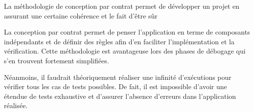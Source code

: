 \documentclass[a4paper, 11pt, notitlepage]{article}
\begin{document}
La méthodologie de conception par contrat permet de développer un projet en assurant une certaine cohérence et le fait d'être sûr 

La conception par contrat permet de penser l'application en terme de composants indépendants et de définir des règles afin d'en faciliter l'implémentation et la vérification. Cette méthodologie est avantageuse lors des phases de débogage qui s'en trouvent fortement simplifiées. 

Néanmoins, il faudrait théoriquement réaliser une infinité d'exécutions pour vérifier tous les cas de tests possibles. De fait, il est impossible d'avoir une étendue de tests exhaustive et d'assurer l'absence d'erreurs dans l'application réalisée. 




















\newpage

\pagestyle{empty}


\newpage
\pagestyle{empty}

\end{document}
